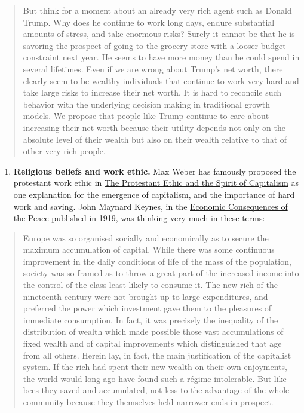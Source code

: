 \documentclass[]{book}
\providecommand{\tightlist}{%
  \setlength{\itemsep}{0pt}\setlength{\parskip}{0pt}}
\begin{document}
\begin{quote}
But think for a moment about an already very rich agent such as Donald
Trump. Why does he continue to work long days, endure substantial
amounts of stress, and take enormous risks? Surely it cannot be that he
is savoring the prospect of going to the grocery store with a looser
budget constraint next year. He seems to have more money than he could
spend in several lifetimes. Even if we are wrong about Trump's net
worth, there clearly seem to be wealthy individuals that continue to
work very hard and take large risks to increase their net worth. It is
hard to reconcile such behavior with the underlying decision making in
traditional growth models. We propose that people like Trump continue to
care about increasing their net worth because their utility depends not
only on the absolute level of their wealth but also on their wealth
relative to that of other very rich people.
\end{quote}

\begin{enumerate}
\def\labelenumi{\arabic{enumi}.}
\setcounter{enumi}{3}
\tightlist
\item
  \textbf{Religious beliefs and work ethic.} Max Weber has famously
  proposed the protestant work ethic in
  \href{https://en.wikipedia.org/wiki/The_Protestant_Ethic_and_the_Spirit_of_Capitalism}{The
  Protestant Ethic and the Spirit of Capitalism} as one explanation for
  the emergence of capitalism, and the importance of hard work and
  saving. John Maynard Keynes, in the
  \href{https://socialsciences.mcmaster.ca/econ/ugcm/3ll3/keynes/pdf\%26filename\%3Dpeace3.pdf}{Economic
  Consequences of the Peace} published in 1919, was thinking very much
  in these terms:
\end{enumerate}

\begin{quote}
Europe was so organised socially and economically as to secure the
maximum accumulation of capital. While there was some continuous
improvement in the daily conditions of life of the mass of the
population, society was so framed as to throw a great part of the
increased income into the control of the class least likely to consume
it. The new rich of the nineteenth century were not brought up to large
expenditures, and preferred the power which investment gave them to the
pleasures of immediate consumption. In fact, it was precisely the
inequality of the distribution of wealth which made possible those vast
accumulations of fixed wealth and of capital improvements which
distinguished that age from all others. Herein lay, in fact, the main
justification of the capitalist system. If the rich had spent their new
wealth on their own enjoyments, the world would long ago have found such
a régime intolerable. But like bees they saved and accumulated, not less
to the advantage of the whole community because they themselves held
narrower ends in prospect.
\end{quote}
\end{document}
